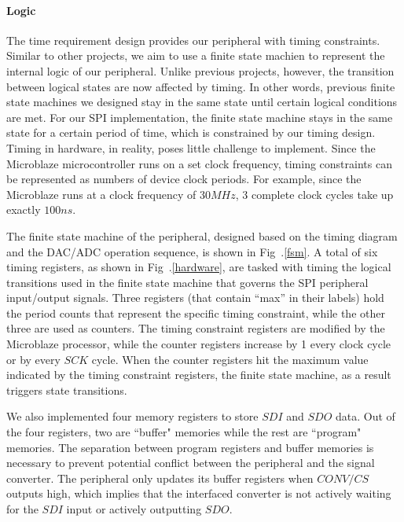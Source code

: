\documentclass[conference]{IEEEtran}
\begin{document}
\paragraph{Logic} The time requirement design provides our peripheral with timing constraints. Similar to other projects, we aim to use a finite state machien to represent the internal logic of our peripheral. Unlike previous projects, however, the transition between logical states are now affected by timing. In other words, previous finite state machines we designed stay in the same state until certain logical conditions are met. For our SPI implementation, the finite state machine stays in the same state for a certain period of time, which is constrained by our timing design. Timing in hardware, in reality, poses little challenge to implement. Since the Microblaze \textregistered{} microcontroller runs on a set clock frequency, timing constraints can be represented as numbers of device clock periods. For example, since the Microblaze\textregistered{} runs at a clock frequency of $30MHz$, 3 complete clock cycles take up exactly $100ns$. 


The finite state machine of the peripheral, designed based on the timing diagram and the DAC/ADC operation sequence\cite{b3}\cite{b4}, is shown in Fig~.\ref{fsm}. A total of six timing registers, as shown in Fig~.\ref{hardware}, are tasked with timing the logical transitions used in the finite state machine that governs the SPI peripheral input/output signals. Three registers (that contain ``max'' in their labels) hold the period counts that represent the specific timing constraint, while the other three are used as counters. The timing constraint registers are modified by the Microblaze\textregistered{} processor, while the counter registers increase by 1 every clock cycle or by every $SCK$ cycle. When the counter registers hit the maximum value indicated by the timing constraint registers, the finite state machine, as a result triggers state transitions.

We also implemented four memory registers to store $SDI$ and $SDO$ data. Out of the four registers, two are ``buffer" memories while the rest are ``program" memories. The separation between program registers and buffer memories is necessary to prevent potential conflict between the peripheral and the signal converter. The peripheral only updates its buffer registers when $CONV/CS$ outputs high, which implies that the interfaced converter is not actively waiting for the $SDI$ input or actively outputting $SDO$.
\end{document}
